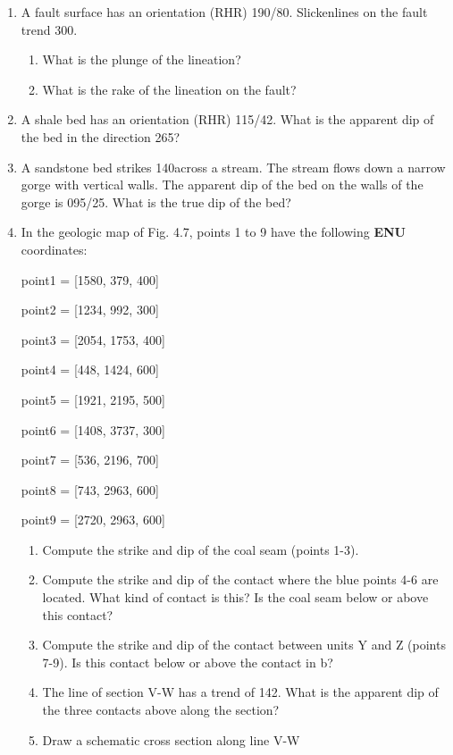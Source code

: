 \documentclass[a4paper , 12pt]{book}
\begin{document}
\begin{enumerate}
    
    \item A fault surface has an orientation (RHR) 190/80. Slickenlines on the fault trend 300\degree. 
    \begin{enumerate}
        \item What is the plunge of the lineation?
        \item What is the rake of the lineation on the fault?
    \end{enumerate}
    
    \item A shale bed has an orientation (RHR) 115/42. What is the apparent dip of the bed in the direction 265\degree?
    
    \item A sandstone bed strikes 140\degree\space across a stream. The stream flows down a narrow gorge with vertical walls. The apparent dip of the bed on the walls of the gorge is 095/25. What is the true dip of the bed?
    
    \item In the geologic map of Fig. 4.7, points 1 to 9 have the following \textbf{ENU} coordinates:
    
    point1 = [1580, 379, 400]
    
    point2 = [1234, 992, 300]
    
    point3 = [2054, 1753, 400]
    
    point4 = [448, 1424, 600]
    
    point5 = [1921, 2195, 500]
    
    point6 = [1408, 3737, 300]
    
    point7 = [536, 2196, 700]
    
    point8 = [743, 2963, 600]
    
    point9 = [2720, 2963, 600]
    
    \begin{enumerate}
        \item Compute the strike and dip of the coal seam (points 1-3).
        \item Compute the strike and dip of the contact where the blue points 4-6 are located. What kind of contact is this? Is the coal seam below or above this contact?
        \item Compute the strike and dip of the contact between units Y and Z (points 7-9). Is this contact below or above the contact in b?
        \item The line of section V-W has a trend of 142\degree. What is the apparent dip of the three contacts above along the section?
        \item Draw a schematic cross section along line V-W
    \end{enumerate}
    

\end{enumerate}
\end{document}
